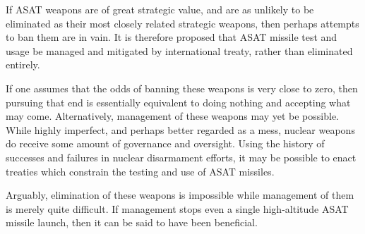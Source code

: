 If ASAT weapons are of great strategic value, and are as unlikely to
be eliminated as their most closely related strategic weapons, then
perhaps attempts to ban them are in vain.  It is therefore proposed
that ASAT missile test and usage be managed and mitigated by
international treaty, rather than eliminated entirely.

If one assumes that the odds of banning these weapons is very close to
zero, then pursuing that end is essentially equivalent to doing
nothing and accepting what may come.  Alternatively, management of
these weapons may yet be possible.  While highly imperfect, and
perhaps better regarded as a mess, nuclear weapons do receive some
amount of governance and oversight.  Using the history of successes
and failures in nuclear disarmament efforts, it may be possible to
enact treaties which constrain the testing and use of ASAT missiles.

Arguably, elimination of these weapons is impossible while management
of them is merely quite difficult.  If management stops even a single
high-altitude ASAT missile launch, then it can be said to have been
beneficial.
